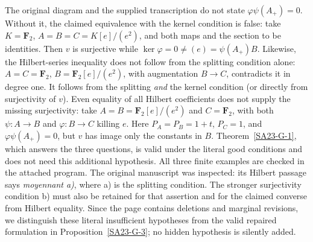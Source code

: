 \begin{remark}\label{SA23-G-4}
The original diagram and the supplied transcription do not state
$\varphi\psi(A_+)=0$.  Without it, the claimed equivalence with the
kernel condition is false: take $K=\mathbf F_2$,
$A=B=C=K[e]/(e^2)$, and both maps and the section to be identities.
Then $v$ is surjective while
$\ker\varphi=0\ne(e)=\psi(A_+)B$.
Likewise, the Hilbert-series inequality does not follow from the
splitting condition alone: $A=C=\mathbf F_2$, $B=\mathbf F_2[e]/(e^2)$, with augmentation
$B\to C$, contradicts it in degree one.  It follows from the splitting
\emph{and} the kernel condition (or directly from surjectivity of $v$).
Even equality of all Hilbert coefficients does not supply the missing
surjectivity: take $A=B=\mathbf F_2[e]/(e^2)$ and $C=\mathbf F_2$,
with both $\psi:A\to B$ and $\varphi:B\to C$ killing $e$.
Here $P_A=P_B=1+t$, $P_C=1$, and $\varphi\psi(A_+)=0$,
but $v$ has image only the constants in $B$.
Theorem~\ref{SA23-G-1}, which answers the three questions, is valid under
the literal good conditions and does not need this additional hypothesis.
All three finite examples are checked in the attached program.
The original manuscript was inspected: its Hilbert passage says
\emph{moyennant a)}, where a) is the splitting condition.  The stronger
surjectivity condition b) must also be retained for that assertion
and for the claimed converse from Hilbert equality.  Since the page
contains deletions and marginal revisions, we distinguish these
literal insufficient hypotheses from the valid repaired formulation
in Proposition~\ref{SA23-G-3}; no hidden hypothesis is silently added.
\end{remark}

